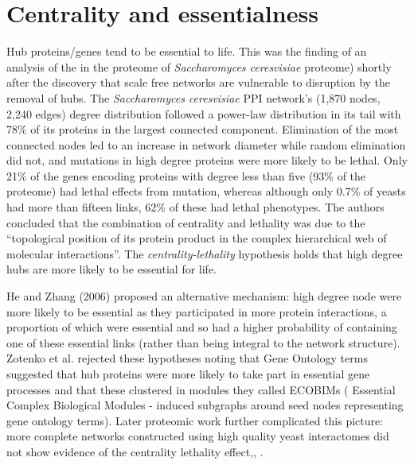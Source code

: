 \section{Centrality and essentialness}
\label{sec:Degree and essentialness}
Hub proteins/genes tend to be essential to life. This was the finding of an analysis of the in the proteome of \textit{Saccharomyces ceresvisiae} proteome) \cite{jeong2001lethality}  shortly after the discovery that scale free networks are vulnerable to disruption by the removal of hubs\cite{albert2000error}.
  The  \textit{Saccharomyces ceresvisiae} PPI network's (1,870 nodes, 2,240 edges) degree distribution followed a power-law distribution in its tail with 78\% of its proteins in the largest connected component\cite{jeong2001lethality}.  Elimination of the most connected nodes led to an increase in network diameter while random elimination did not, and mutations in high degree proteins were more likely to be lethal. Only 21\% of the genes encoding proteins with degree less than five (93\% of the proteome) had lethal effects from mutation, whereas although only 0.7\% of yeasts had more than fifteen links,  62\% of these had lethal phenotypes. The authors \cite{jeong2001lethality} concluded that the combination of centrality and lethality was due to the ``topological position of its protein product in the complex hierarchical web of molecular interactions''. The \textit{centrality-lethality} hypothesis holds that high degree hubs are more likely to be essential for life\cite{zotenko2008hubs}. 

He and Zhang (2006)\cite{he2006hubs} proposed an alternative mechanism: high degree node were more likely to be essential as they participated in more protein interactions, a proportion of which were essential and so had a higher probability of containing one of these essential links (rather than being integral to the network structure). Zotenko et al. \cite{zotenko2008hubs} rejected these hypotheses noting that Gene Ontology terms suggested that hub proteins were more likely to take part in essential gene processes and that these clustered in modules they called ECOBIMs ( Essential Complex Biological Modules - induced subgraphs around seed nodes representing gene ontology terms).  
Later proteomic work further complicated this picture: more complete networks constructed using high quality yeast interactomes did not show evidence of the centrality lethality effect\cite{milenkovic2011dominating},\cite{yu2008high}, \cite{ratmann2009evidence}. 

